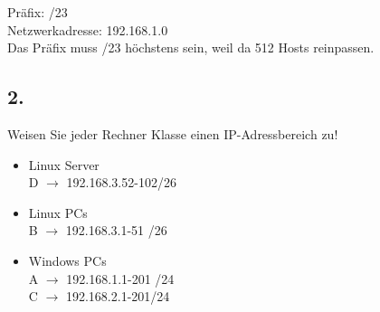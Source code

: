 \documentclass[paper=a4, fontsize=11pt]{scrartcl}
\numberwithin{equation}{section}
\numberwithin{figure}{section}
\numberwithin{table}{section}
\begin{document}
Präfix: /23 \\
Netzwerkadresse: 192.168.1.0 \\

Das Präfix muss /23 höchstens sein, weil da 512 Hosts reinpassen. 

\subsection{2.}
Weisen Sie jeder Rechner Klasse einen IP-Adressbereich zu! \\

\begin{itemize}
\item Linux Server \\
D $\rightarrow$ 192.168.3.52-102/26 \\
\item Linux PCs \\
B $\rightarrow$ 192.168.3.1-51 /26 \\
\item Windows PCs \\
A $\rightarrow$ 192.168.1.1-201 /24 \\ 
C $\rightarrow$ 192.168.2.1-201/24 \\ 
\end{itemize}

\end{document}
